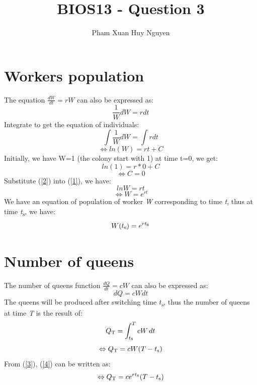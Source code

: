 \documentclass{article}
\title{BIOS13 - Question 3}
\author{Pham Xuan Huy Nguyen}
\begin{document}
\maketitle
\section{Workers population}
The equation \(\frac{dW}{dt}=rW\) can also be expressed as:
\[\frac{1}{W}dW=rdt \]
Integrate to get the equation of individuals:
\[\int{\frac{1}{W}dW}=\int{rdt}\]
\begin{equation}\label{1}
   \Leftrightarrow ln(W)=rt + C
\end{equation}
Initially, we have W=1 (the colony start with 1) at time t=0, we get:
\[ln(1)=r*0 + C\]
\begin{equation}\label{2}
    \Leftrightarrow C=0
\end{equation}
Substitute (\ref{2}) into (\ref{1}), we have:
\[lnW=rt \]
\[\Leftrightarrow W=e^{rt} \]
We have an equation of population of worker \textit{W} corresponding to time \textit{t}, thus at time \textit{t\textsubscript{s}}, we have:
\begin{equation}\label{3}
W(t\textsubscript{s})=e^{rt\textsubscript{s}}
\end{equation}
\section{Number of queens}
The number of queens function \(\frac{dQ}{dt}=cW\) can also be expressed as:
\[dQ=cWdt \]
The queens will be produced after switching time \textit{t\textsubscript{s}}, thus the number of queens at time \textit{T} is the result of:
\[Q\textsubscript{T} = \int_{t\textsubscript{s}}^{T} cW \,dt \]
\begin{equation}\label{4}
\Leftrightarrow Q\textsubscript{T} =cW(T-t\textsubscript{s})
\end{equation}
From (\ref{3}), (\ref{4}) can be written as:
\begin{equation}\label{5}
    \Leftrightarrow Q\textsubscript{T} =ce^{rt\textsubscript{s}}(T-t\textsubscript{s})
\end{equation}
\end{document}

